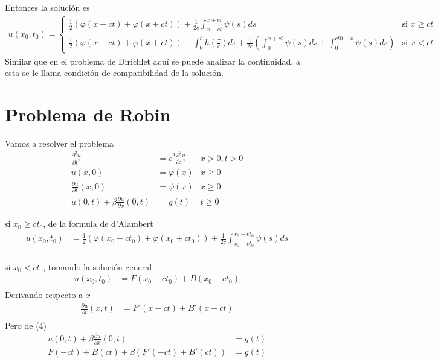 \documentclass[11pt]{book}
\theoremstyle{plain}
\theoremstyle{definition}
\begin{document}
Entonces la solución es
\begin{align}
    u(x_0,t_0)=
    \begin{cases} 
    \frac{1}{2}\left(\varphi(x-ct)+\varphi(x+ct)\right)
        +\frac{1}{2c}\int_{x-ct}^{x+ct}\psi(s)ds & \text{si }  x\geq ct\\
     \frac{1}{2}\left( \varphi(x - ct) + \varphi(x + ct)\right) -\int _{0}^{t}h(\frac{\tau}{c})d\tau + \frac{1}{2c}\left( \int_{0}^{x+ct}\psi(s)ds+ \int_{0}^{ct0-x}\psi(s)ds\right) & \text{si } x<ct
\end{cases} 
\end{align}
Similar que en el problema de Dirichlet aquí se puede analizar la continuidad, a esta se le llama condición de compatibilidad de la solución. 
\newpage
\section{Problema de Robin}
Vamos a resolver el problema
\setcounter{equation}{0}
\begin{align}
    \frac{\partial^2 u}{\partial t^2} &= c^2 \frac{\partial^2 u}{\partial x^2} & x > 0, t > 0\\ 
    u(x,0)&= \varphi(x) & x \geq 0\\
    \frac{\partial u}{\partial t}(x,0) &= \psi(x) & x \geq 0\\
    u(0,t) + \beta \frac{\partial u}{\partial x}(0,t) &= g(t) & t \geq 0
\end{align}

si $x_{0}\geq ct_{0}$, de la formula de d'Alambert
\begin{align*}
    u(x_0,t_0) & = \frac{1}{2}\left( \varphi(x_0 - ct_0) + \varphi(x_0 + ct_0)\right) +\frac{1}{2c}\int_{x_0-ct_0}^{x_0+ct_0}\psi(s)ds\\
\end{align*}

si $x_{0}< ct_{0}$, tomando la solución general
\begin{align*}
    u(x_0,t_0) & = F(x_0-ct_0) + B(x_0+ct_0)\\
\end{align*}
Derivando respecto a $x$
\begin{align*}
    \frac{\partial u}{\partial t}(x,t) & = F'(x-ct) + B'(x+ct)\\
\end{align*}
Pero de (4)
\begin{align*}
    u(0,t) + \beta \frac{\partial u}{\partial x}(0,t) &= g(t)\\
    F(-ct) + B(ct) + \beta (F'(-ct) + B'(ct)) &= g(t)\\
\end{align*}
\end{document}
